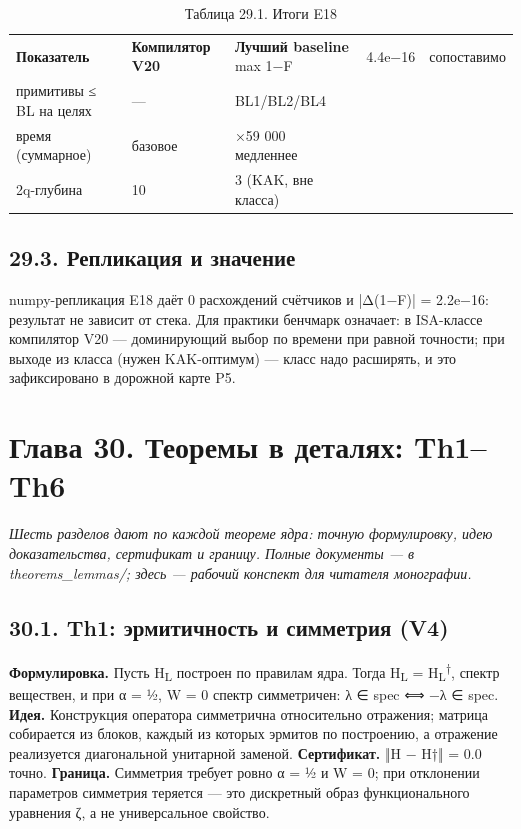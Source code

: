 \documentclass[11pt,a4paper]{article}
\begin{document}
\begin{table}[htbp]\centering\small
\caption{Таблица 29.1. Итоги E18}
\begin{tabular}{p{} p{} p{}}
\toprule
\textbf{Показатель} & \textbf{Компилятор V20} & \textbf{Лучший baseline}
\midrule
max 1−F & 4.4e−16 & сопоставимо \\
примитивы ≤ BL на целях & — & BL1/BL2/BL4 \\
время (суммарное) & базовое & ×59 000 медленнее \\
2q-глубина & 10 & 3 (KAK, вне класса) \\
\bottomrule
\end{tabular}
\end{table}

\subsection{29.3. Репликация и значение}

numpy-репликация E18 даёт 0 расхождений счётчиков и |Δ(1−F)| = 2.2e−16: результат не зависит от стека. Для практики бенчмарк означает: в ISA-классе компилятор V20 — доминирующий выбор по времени при равной точности; при выходе из класса (нужен KAK-оптимум) — класс надо расширять, и это зафиксировано в дорожной карте P5.

\section{Глава 30. Теоремы в деталях: Th1–Th6}

\noindent\textit{\color{copper}Шесть разделов дают по каждой теореме ядра: точную формулировку, идею доказательства, сертификат и границу. Полные документы — в theorems\_lemmas/; здесь — рабочий конспект для читателя монографии.}

\subsection{30.1. Th1: эрмитичность и симметрия (V4)}

\textbf{Формулировка.} Пусть H\textsubscript{L} построен по правилам ядра. Тогда H\textsubscript{L} = H\textsubscript{L}\textsuperscript{†}, спектр веществен, и при α = ½, W = 0 спектр симметричен: λ ∈ spec ⟺ −λ ∈ spec. \textbf{Идея.} Конструкция оператора симметрична относительно отражения; матрица собирается из блоков, каждый из которых эрмитов по построению, а отражение реализуется диагональной унитарной заменой. \textbf{Сертификат.} ‖H − H†‖ = 0.0 точно. \textbf{Граница.} Симметрия требует ровно α = ½ и W = 0; при отклонении параметров симметрия теряется — это дискретный образ функционального уравнения ζ, а не универсальное свойство.
\end{document}
